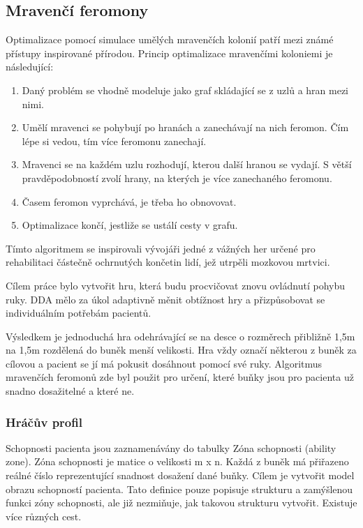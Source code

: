 \subsection{Mravenčí feromony} \label{sec:ants}

Optimalizace pomocí simulace umělých mravenčích kolonií patří mezi známé přístupy inspirované přírodou. Princip optimalizace mravenčími koloniemi je následující:

\begin{enumerate}
	\item Daný problém se vhodně modeluje jako graf skládající se z uzlů a hran mezi nimi.
	\item Umělí mravenci se pohybují po hranách a zanechávají na nich feromon. Čím lépe si vedou, tím více feromonu zanechají.
	\item Mravenci se na každém uzlu rozhodují, kterou další hranou se vydají. S větší pravděpodobností zvolí hrany, na kterých je více zanechaného feromonu.
	\item Časem feromon vyprchává, je třeba ho obnovovat.
	\item Optimalizace končí, jestliže se ustálí cesty v grafu. 
\end{enumerate}

Tímto algoritmem se inspirovali vývojáři jedné z vážných her určené pro rehabilitaci částečně ochrnutých končetin lidí, jež utrpěli mozkovou mrtvici\cite{26poststroke}.

Cílem práce bylo vytvořit hru, která budu procvičovat znovu ovládnutí pohybu ruky. DDA mělo za úkol adaptivně měnit obtížnost hry a přizpůsobovat se individuálním potřebám pacientů. 

Výsledkem je jednoduchá hra odehrávající se na desce o rozměrech přibližně 1,5m na 1,5m rozdělená do buněk menší velikosti. Hra vždy označí některou z buněk za cílovou a pacient se jí má pokusit dosáhnout pomocí své ruky. Algoritmus mravenčích feromonů zde byl použit pro určení, které buňky jsou pro pacienta už snadno dosažitelné a které ne.

\subsubsection{Hráčův profil}

Schopnosti pacienta jsou zaznamenávány do tabulky Zóna schopnosti (ability zone). Zóna schopnosti je matice o velikosti m x n. Každá z buněk má přiřazeno reálné číslo reprezentující snadnost dosažení dané buňky. Cílem je vytvořit model obrazu schopností pacienta.
Tato definice pouze popisuje strukturu a zamýšlenou funkci zóny schopnosti, ale již nezmiňuje, jak takovou strukturu vytvořit. Existuje více různých cest.

